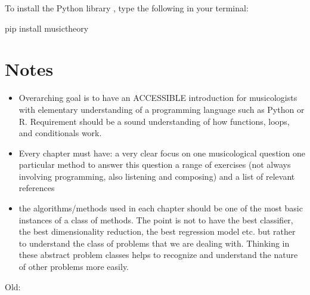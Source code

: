 \documentclass[letterpaper,10pt,english]{sphinxmanual}
\begin{document}
To install the Python library , type the following in your terminal:

\begin{sphinxVerbatim}[commandchars=\\\{\}]
pip install musictheory
\end{sphinxVerbatim}


\section{Notes}
\label{\detokenize{0_intro:notes}}\begin{itemize}
\item {} 
Overarching goal is to have an ACCESSIBLE introduction for musicologists with elementary understanding of a programming language such as Python or R. Requirement should be a sound understanding of how functions, loops, and conditionals work.

\item {} 
Every chapter must have:
\textendash{} a very clear focus on one musicological question
\textendash{} one particular method to answer this question
\textendash{} a range of exercises (not always involving programming, also listening and composing)
\textendash{} and a list of relevant references

\item {} 
the algorithms/methods used in each chapter should be one of the most basic instances of a class of methods. The point is not to have the best classifier, the best dimensionality reduction, the best regression model etc. but rather to understand the class of problems that we are dealing with. Thinking in these abstract problem classes helps to recognize and understand the nature of other problems more easily.

\end{itemize}

Old:
\end{document}
